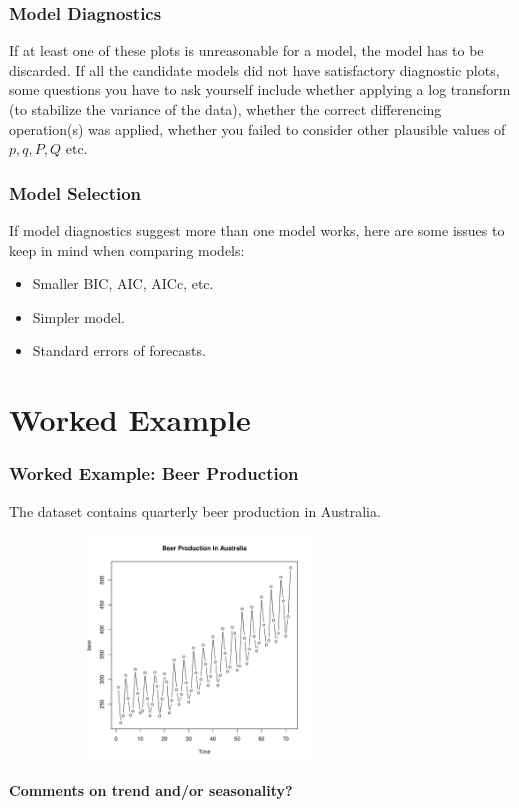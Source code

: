\documentclass[%
xcolor=pdftex]{beamer}
\begin{document}
\begin{frame}
\frametitle{Model Diagnostics}

If at least one of these plots is unreasonable for a model, the model has to be discarded. If all the candidate models did not have satisfactory diagnostic plots, some questions you have to ask yourself include whether applying a log transform (to stabilize the variance of the data), whether the correct differencing operation(s) was applied, whether you failed to consider other plausible values of $p, q, P, Q$ etc.

\end{frame}

\begin{frame}
\frametitle{Model Selection}

If model diagnostics suggest more than one model works, here are some issues to keep in mind when comparing models:

\begin{itemize}
\item Smaller BIC, AIC, AICc, etc.
\item Simpler model.
\item Standard errors of forecasts.
\end{itemize}


\end{frame}

\section{Worked Example}
\frame{\tableofcontents[currentsection]}

\begin{frame}
\frametitle{Worked Example: Beer Production}

The dataset contains quarterly beer production in Australia.

\includegraphics[width=100mm, height=60mm]{beer_ts.pdf}

\textbf{Comments on trend and/or seasonality?}

\end{frame}
\end{document}
